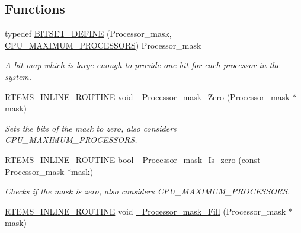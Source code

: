 \subsection*{Functions}
\begin{DoxyCompactItemize}
\item 
\mbox{\label{group__RTEMSScoreProcessorMask_ga2ef796d8c19df1c8902de636b3b667cc}} 
typedef \mbox{\hyperlink{group__RTEMSScoreProcessorMask_ga2ef796d8c19df1c8902de636b3b667cc}{B\+I\+T\+S\+E\+T\+\_\+\+D\+E\+F\+I\+NE}} (Processor\+\_\+mask, \mbox{\hyperlink{no__cpu_2include_2rtems_2score_2cpu_8h_adea68a7fa02909edcebee08748f94223}{C\+P\+U\+\_\+\+M\+A\+X\+I\+M\+U\+M\+\_\+\+P\+R\+O\+C\+E\+S\+S\+O\+RS}}) Processor\+\_\+mask
\begin{DoxyCompactList}\small\item\em A bit map which is large enough to provide one bit for each processor in the system. \end{DoxyCompactList}\item 
\mbox{\hyperlink{group__RTEMSScoreBaseDefs_gac216239df231d5dbd15e3520b0b9313f}{R\+T\+E\+M\+S\+\_\+\+I\+N\+L\+I\+N\+E\+\_\+\+R\+O\+U\+T\+I\+NE}} void \mbox{\hyperlink{group__RTEMSScoreProcessorMask_ga8700bc918e1e431734c3a86de5ce1e8d}{\+\_\+\+Processor\+\_\+mask\+\_\+\+Zero}} (Processor\+\_\+mask $\ast$mask)
\begin{DoxyCompactList}\small\item\em Sets the bits of the mask to zero, also considers C\+P\+U\+\_\+\+M\+A\+X\+I\+M\+U\+M\+\_\+\+P\+R\+O\+C\+E\+S\+S\+O\+RS. \end{DoxyCompactList}\item 
\mbox{\hyperlink{group__RTEMSScoreBaseDefs_gac216239df231d5dbd15e3520b0b9313f}{R\+T\+E\+M\+S\+\_\+\+I\+N\+L\+I\+N\+E\+\_\+\+R\+O\+U\+T\+I\+NE}} bool \mbox{\hyperlink{group__RTEMSScoreProcessorMask_gad7417e61f45dc48871943c92b7d13167}{\+\_\+\+Processor\+\_\+mask\+\_\+\+Is\+\_\+zero}} (const Processor\+\_\+mask $\ast$mask)
\begin{DoxyCompactList}\small\item\em Checks if the mask is zero, also considers C\+P\+U\+\_\+\+M\+A\+X\+I\+M\+U\+M\+\_\+\+P\+R\+O\+C\+E\+S\+S\+O\+RS. \end{DoxyCompactList}\item 
\mbox{\hyperlink{group__RTEMSScoreBaseDefs_gac216239df231d5dbd15e3520b0b9313f}{R\+T\+E\+M\+S\+\_\+\+I\+N\+L\+I\+N\+E\+\_\+\+R\+O\+U\+T\+I\+NE}} void \mbox{\hyperlink{group__RTEMSScoreProcessorMask_gae8e13385b3952d2e804d06aa36e6604a}{\+\_\+\+Processor\+\_\+mask\+\_\+\+Fill}} (Processor\+\_\+mask $\ast$mask)

\end{DoxyCompactItemize}
